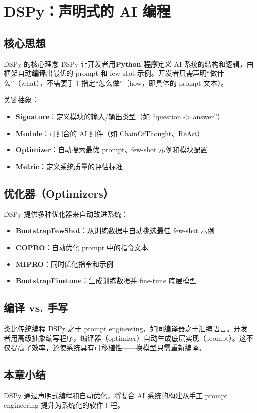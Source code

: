 \section{DSPy：声明式的 AI 编程}

\subsection{核心思想}

\begin{importantbox}{DSPy 的核心理念}
DSPy 让开发者用\textbf{Python 程序}定义 AI 系统的结构和逻辑，由框架自动\textbf{编译}出最优的 prompt 和 few-shot 示例。开发者只需声明``做什么''（what），不需要手工指定``怎么做''（how，即具体的 prompt 文本）。
\end{importantbox}

关键抽象：
\begin{itemize}
    \item \textbf{Signature}：定义模块的输入/输出类型（如 ``question -> answer''）
    \item \textbf{Module}：可组合的 AI 组件（如 ChainOfThought、ReAct）
    \item \textbf{Optimizer}：自动搜索最优 prompt、few-shot 示例和模块配置
    \item \textbf{Metric}：定义系统质量的评估标准
\end{itemize}

\subsection{优化器（Optimizers）}

DSPy 提供多种优化器来自动改进系统：

\begin{itemize}
    \item \textbf{BootstrapFewShot}：从训练数据中自动挑选最佳 few-shot 示例
    \item \textbf{COPRO}：自动优化 prompt 中的指令文本
    \item \textbf{MIPRO}：同时优化指令和示例
    \item \textbf{BootstrapFinetune}：生成训练数据并 fine-tune 底层模型
\end{itemize}

\subsection{编译 vs. 手写}

\begin{knowledgebox}{类比传统编程}
DSPy 之于 prompt engineering，如同编译器之于汇编语言。开发者用高级抽象编写程序，编译器（optimizer）自动生成底层实现（prompt）。这不仅提高了效率，还使系统具有可移植性——换模型只需重新编译。
\end{knowledgebox}

\subsection{本章小结}

DSPy 通过声明式编程和自动优化，将复合 AI 系统的构建从手工 prompt engineering 提升为系统化的软件工程。

